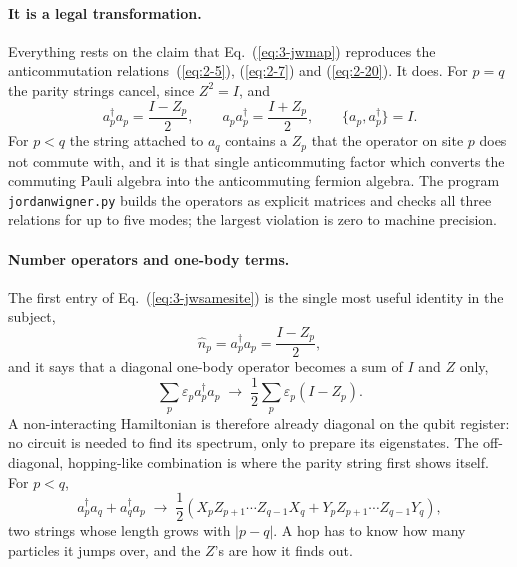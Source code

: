 \paragraph{It is a legal transformation.}
Everything rests on the claim that Eq.~(\ref{eq:3-jwmap}) reproduces the
anticommutation relations~(\ref{eq:2-5}), (\ref{eq:2-7}) and
(\ref{eq:2-20}).  It does.  For $p=q$ the parity strings cancel, since
$Z^2=I$, and
\begin{equation}
  a_p^{\dagger}a_p = \frac{I-Z_p}{2},
  \qquad
  a_pa_p^{\dagger} = \frac{I+Z_p}{2},
  \qquad
  \{a_p,a_p^{\dagger}\} = I .
  \label{eq:3-jwsamesite}
\end{equation}
For $p<q$ the string attached to $a_q$ contains a $Z_p$ that the operator on
site $p$ does not commute with, and it is that single anticommuting factor
which converts the commuting Pauli algebra into the anticommuting fermion
algebra.  The program \texttt{jordanwigner.py} builds the operators as
explicit matrices and checks all three relations for up to five modes; the
largest violation is zero to machine precision.

\paragraph{Number operators and one-body terms.}
The first entry of Eq.~(\ref{eq:3-jwsamesite}) is the single most useful
identity in the subject,
\begin{equation}
  \hat{n}_p = a_p^{\dagger}a_p = \frac{I-Z_p}{2},
  \label{eq:3-jwnumber}
\end{equation}
and it says that a diagonal one-body operator becomes a sum of $I$ and $Z$
only,
\begin{equation}
  \sum_p \varepsilon_p a_p^{\dagger}a_p
   \;\longrightarrow\;
   \frac12\sum_p\varepsilon_p\left(I-Z_p\right) .
  \label{eq:3-jwonebodydiagonal}
\end{equation}
A non-interacting Hamiltonian is therefore already diagonal on the qubit
register: no circuit is needed to find its spectrum, only to prepare its
eigenstates.  The off-diagonal, hopping-like combination is where the parity
string first shows itself.  For $p<q$,
\begin{equation}
  a_p^{\dagger}a_q + a_q^{\dagger}a_p
   \;\longrightarrow\;
   \frac12\left(
     X_pZ_{p+1}\cdots Z_{q-1}X_q
     + Y_pZ_{p+1}\cdots Z_{q-1}Y_q
   \right),
  \label{eq:3-jwhopping}
\end{equation}
two strings whose length grows with $|p-q|$.  A hop has to know how many
particles it jumps over, and the $Z$'s are how it finds out.

